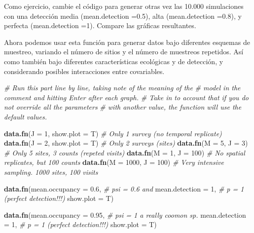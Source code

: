 \documentclass[
]{book}
\newenvironment{Shaded}{\begin{snugshade}}{\end{snugshade}}
\newcommand{\CommentTok}[1]{\textcolor[rgb]{0.56,0.35,0.01}{\textit{#1}}}
\newcommand{\DataTypeTok}[1]{\textcolor[rgb]{0.13,0.29,0.53}{#1}}
\newcommand{\DecValTok}[1]{\textcolor[rgb]{0.00,0.00,0.81}{#1}}
\newcommand{\FloatTok}[1]{\textcolor[rgb]{0.00,0.00,0.81}{#1}}
\newcommand{\KeywordTok}[1]{\textcolor[rgb]{0.13,0.29,0.53}{\textbf{#1}}}
\newcommand{\NormalTok}[1]{#1}
\begin{document}
Como ejercicio, cambie el código para generar otras vez las 10.000 simulaciones con una detección media (mean.detection =0.5), alta (mean.detection =0.8), y perfecta (mean.detection =1). Compare las gráficas resultantes.

Ahora podemos usar esta función para generar datos bajo diferentes esquemas de muestreo, variando el número de sitios y el número de muestreos repetidos. Así como también bajo diferentes características ecológicas y de detección, y considerando posibles interacciones entre covariables.

\begin{Shaded}
\begin{Highlighting}[]
\CommentTok{# Run this part line by line, taking note of the meaning of the }
\CommentTok{# model in the comment and hitting Enter after each graph.}
\CommentTok{# Take in to account that if you do not override all the parameters}
\CommentTok{# with another value, the function will use the default values.}

\KeywordTok{data.fn}\NormalTok{(}\DataTypeTok{J =} \DecValTok{1}\NormalTok{, }\DataTypeTok{show.plot =}\NormalTok{ T)  }\CommentTok{# Only 1 survey (no temporal replicate)}
\KeywordTok{data.fn}\NormalTok{(}\DataTypeTok{J =} \DecValTok{2}\NormalTok{, }\DataTypeTok{show.plot =}\NormalTok{ T)  }\CommentTok{# Only 2 surveys (sites)}
\KeywordTok{data.fn}\NormalTok{(}\DataTypeTok{M =} \DecValTok{5}\NormalTok{, }\DataTypeTok{J =} \DecValTok{3}\NormalTok{)          }\CommentTok{# Only 5 sites, 3 counts (repeted visits)}
\KeywordTok{data.fn}\NormalTok{(}\DataTypeTok{M =} \DecValTok{1}\NormalTok{, }\DataTypeTok{J =} \DecValTok{100}\NormalTok{)        }\CommentTok{# No spatial replicates, but 100 counts}
\KeywordTok{data.fn}\NormalTok{(}\DataTypeTok{M =} \DecValTok{1000}\NormalTok{, }\DataTypeTok{J =} \DecValTok{100}\NormalTok{)     }\CommentTok{# Very intensive sampling. 1000 sites, 100 visits}

\KeywordTok{data.fn}\NormalTok{(}\DataTypeTok{mean.occupancy =} \FloatTok{0.6}\NormalTok{,   }\CommentTok{# psi = 0.6 and}
        \DataTypeTok{mean.detection =} \DecValTok{1}\NormalTok{,     }\CommentTok{# p = 1 (perfect detection!!!)}
        \DataTypeTok{show.plot =}\NormalTok{ T)}

\KeywordTok{data.fn}\NormalTok{(}\DataTypeTok{mean.occupancy =} \FloatTok{0.95}\NormalTok{,  }\CommentTok{# psi = 1 a really coomon sp.}
        \DataTypeTok{mean.detection =} \DecValTok{1}\NormalTok{,     }\CommentTok{# p = 1 (perfect detection!!!)}
        \DataTypeTok{show.plot =}\NormalTok{ T)}


\end{Highlighting}
\end{Shaded}
\end{document}
